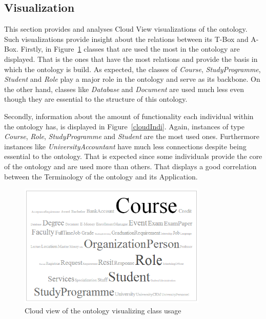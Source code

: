 \documentclass{article}    %
\begin{document}
\subsection{Visualization}
%
This section provides and analyses Cloud View visualizations of the ontology. Such visualizations provide insight about the relations between its T-Box and A-Box. Firstly, in Figure~\ref{classUsage} classes that are used the most in the ontology are displayed. That is the ones that have the most relations and provide the basis in which the ontology is build. As expected, the classes of \textit{Course}, \textit{StudyProgramme}, \textit{Student} and \textit{Role} play a major role in the ontology and serve as its backbone. On the other hand, classes like \textit{Database} and \textit{Document} are used much less even though they are essential to the structure of this ontology.

Secondly, information about the amount of functionality each individual within the ontology has, is displayed in Figure~\ref{cloudIndi}. Again, instances of type \textit{Course}, \textit{Role}, \textit{StudyProgramme} and \textit{Student} are the most used ones. Furthermore instances like \textit{UniversityAccountant} have much less connections despite being essential to the ontology. That is expected since some individuals provide the core of the ontology and are used more than others. That displays a good correlation between the Terminology of the ontology and its Application.
\begin{figure}[htbp]
  \centering
    \includegraphics[width=0.8\textwidth]{Materials/Figures/classUsageCloud.png}
    \caption{Cloud view of the ontology visualizing class usage}
  \label{classUsage}
\end{figure}
\end{document}
